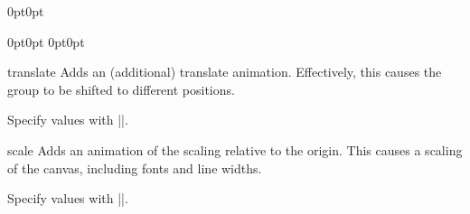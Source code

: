 \begin{command}{\pgfsys@animation@canvas@transform{}}
\begin{codeexample}[imagesource={standalone/pgfmanual-en-pgfsys-animations-animation-15.svg}]
\animationcanvasexample
{}
{}
\end{codeexample}
\begin{codeexample}[imagesource={standalone/pgfmanual-en-pgfsys-animations-animation-16.svg}]
\animationcanvasexample
{\pgfsys@transformshift{10mm}{0mm}}
{\pgfsys@transformshift{-10mm}{0mm}}
\end{codeexample}
\begin{codeexample}[imagesource={standalone/pgfmanual-en-pgfsys-animations-animation-17.svg}]
\animationcanvasexample
{
                    {0pt}{0pt}}
{}
\end{codeexample}
\begin{codeexample}[imagesource={standalone/pgfmanual-en-pgfsys-animations-animation-18.svg}]
\animationcanvasexample
{
                    {0pt}{0pt}}
{
                    {0pt}{0pt}}
\end{codeexample}
\end{command}

\begin{sysanimateattribute}{translate}
    Adds an (additional) translate animation. Effectively, this causes the
    group to be shifted to different positions.

    Specify values with |\pgfsysanimvaltranslate|.
\begin{codeexample}[imagesource={standalone/pgfmanual-en-pgfsys-animations-animation-19.svg}]
\end{codeexample}
\end{sysanimateattribute}

\begin{sysanimateattribute}{scale}
    Adds an animation of the scaling relative to the origin. This causes a
    scaling of the canvas, including fonts and line widths.

    Specify values with |\pgfsysanimvalscale|.
\begin{codeexample}[imagesource={standalone/pgfmanual-en-pgfsys-animations-animation-20.svg}]
\end{codeexample}
\end{sysanimateattribute}

